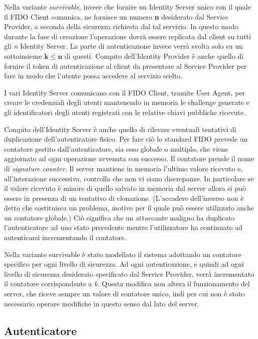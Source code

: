 Nella variante \emph{survivable}, invece che fornire un Identity Server unico con il quale il FIDO Client comunica, ne fornisce un numero \textbf{n} desiderato dal Service Provider, a seconda della sicurezza richiesta dal tal servizio. In questo modo durante la fase di creazione l'operazione dovrà essere replicata dal client su tutti gli \emph{n} Identity Server. La parte di autenticazione invece verrà svolta solo su un sottoinsieme $\mathbf{k\leq n}$ di questi. Compito dell'Identity Provider è anche quello di fornire il token di autenticazione al client da presentare al Service Provider per fare in modo che l'utente possa accedere al servizio scelto.

I vari Identity Server comunicano con il FIDO Client, tramite User Agent, per creare le credenziali degli utenti mantenendo in memoria le challenge generate e gli identificatori degli utenti registrati con le relative chiavi pubbliche ricevute. 

Compito dell'Identity Server è anche quello di rilevare eventuali tentativi di duplicazione dell'autenticatore fisico. Per fare ciò lo standard FIDO prevede un contatore gestito dall'autenticatore, sia esso globale o multiplo, che viene aggiornato ad ogni operazione avvenuta con successo. Il contatore prende il nome di \emph{signature counter}. Il server mantiene in memoria l'ultimo valore ricevuto e, all'interazione successiva, controlla che non vi siano discrepanze. In particolare se il valore ricevuto è minore di quello salvato in memoria dal server allora si può essere in presenza di un tentativo di clonazione. (L'accadere dell'inverso non è detto che costituisca un problema, motivo per il quale può essere utilizzato anche un contatore globale.) Ciò significa che un attaccante maligno ha duplicato l'autenticatore ad uno stato precedente mentre l'utilizzatore ha continuato ad autenticarsi incrementando il contatore. 

Nella variante survivable è stato modellato il sistema adottando un contatore specifico per ogni livello di sicurezza. Ad ogni autenticazione, e quindi ad ogni livello di sicurezza desiderato specificato dal Service Provider, verrà incrementato il contatore corrispondente a \emph{k}. Questa modifica non altera il funzionamento del server, che riceve sempre un valore di contatore unico, indi per cui non è stato necessario operare modifiche in questo senso dal lato del server.

\subsection{Autenticatore}
\label{autenticatore}

